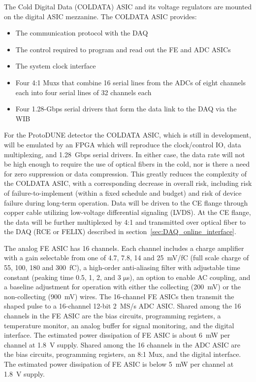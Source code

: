 The Cold Digital Data (COLDATA) ASIC and its voltage regulators are mounted on the digital ASIC mezzanine.
The COLDATA ASIC provides:
\begin{itemize}
\item The communication protocol with the DAQ
\item The control required to program and read out the FE and ADC ASICs
\item The system clock interface
\item Four 4:1 Muxs that combine 16 serial lines from the ADCs of eight 
channels each into four serial lines of 32 channels each
\item Four 1.28-Gbps serial drivers that form the data link to the DAQ via the WIB
\end{itemize}
For the ProtoDUNE detector the COLDATA ASIC, which is still in development, will be 
emulated by an FPGA which will reproduce the clock/control IO, data multiplexing,
and 1.28~Gbps serial drivers.
In either case, the data rate will not be high enough to require the use of optical fibers in the cold,
nor is there a need for zero suppression or data compression.
This greatly reduces the complexity of the COLDATA ASIC, with a corresponding decrease in overall risk,
including risk of failure-to-implement (within a fixed schedule and budget)
and risk of device failure during long-term operation.
Data will be driven to the CE flange through copper cable utilizing low-voltage differential signaling (LVDS).
At the CE flange, the data will be further multiplexed by 4:1 and transmitted over optical
fiber to the DAQ (RCE or FELIX) described in section~\ref{sec:DAQ_online_interface}.

The analog FE ASIC has 16 channels.
Each channel includes a charge amplifier with a gain selectable from one of 4.7, 7.8, 14 and 25~mV/fC
(full scale charge of 55, 100, 180 and 300~fC),
a high-order anti-aliasing filter with adjustable time
constant (peaking time 0.5, 1, 2, and 3 $\mathrm{\mu}$s),
an option to enable AC coupling,
and a baseline adjustment for operation with either the collecting (200~mV) or the non-collecting (900~mV) wires.
The 16-channel FE ASICs then transmit the shaped pulse to a 16-channel 12-bit 2~MS/s ADC ASIC.
Shared among the 16 channels in the FE ASIC are the bias circuits, programming registers,
a temperature monitor, an analog buffer for signal monitoring, and the digital interface.
The estimated power dissipation of FE ASIC is about 6~mW per channel at 1.8~V supply.
Shared among the 16 channels in the ADC ASIC are the bias circuits, programming registers,
an 8:1 Mux, and the digital interface.
The estimated power dissipation of FE ASIC is below 5~mW per channel at 1.8~V supply.


